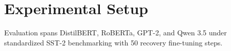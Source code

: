 \section{Experimental Setup}
Evaluation spans DistilBERT, RoBERTa, GPT-2, and Qwen 3.5 under standardized SST-2 benchmarking with 50 recovery fine-tuning steps.
